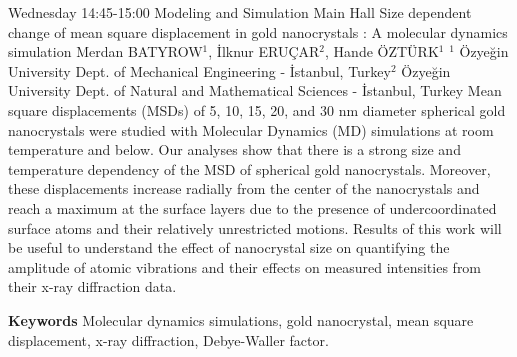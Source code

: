 
    \begin{abstract_basarim}
    {Wednesday 14:45-15:00}
    {Modeling and Simulation}
    {Main Hall}
    {Size dependent change of mean square displacement in gold nanocrystals : A molecular dynamics simulation}
    {%
    Merdan BATYROW$^{1}$, İlknur ERUÇAR$^{2}$, Hande ÖZTÜRK$^{1}$}
    {%
    }
    {%
    $^1$ Özyeğin University Dept. of Mechanical Engineering - İstanbul, Turkey\newline{}$^2$ Özyeğin University Dept. of Natural and Mathematical Sciences - İstanbul, Turkey}
    Mean square displacements (MSDs) of 5, 10, 15, 20, and 30 nm diameter spherical gold nanocrystals were studied with Molecular Dynamics (MD) simulations at room temperature and below. Our analyses show that there is a strong size and temperature dependency of the MSD of spherical gold nanocrystals. Moreover, these displacements increase radially from the center of the nanocrystals and reach a maximum at the surface layers due to the presence of undercoordinated surface atoms and their relatively unrestricted motions. Results of this work will be useful to understand the effect of nanocrystal size on quantifying the amplitude of atomic vibrations and their effects on measured intensities from their x-ray diffraction data. 
    
        \textbf{Keywords} \newline{}Molecular dynamics simulations, gold nanocrystal, mean square displacement, x-ray diffraction, Debye-Waller factor.
    \end{abstract_basarim}
    
